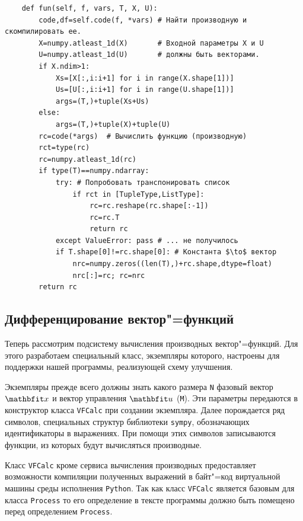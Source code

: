 \documentclass[a4paper,14pt, openany, twoside, draft]{extbook} %
\begin{document}
\begin{verbatim}
    def fun(self, f, vars, T, X, U):
        code,df=self.code(f, *vars) # Найти производную и скомпилировать ее.
        X=numpy.atleast_1d(X)       # Входной параметры X и U
        U=numpy.atleast_1d(U)       # должны быть векторами.
        if X.ndim>1:
            Xs=[X[:,i:i+1] for i in range(X.shape[1])]
            Us=[U[:,i:i+1] for i in range(U.shape[1])]
            args=(T,)+tuple(Xs+Us)
        else:
            args=(T,)+tuple(X)+tuple(U)
        rc=code(*args)  # Вычислить функцию (производную)
        rct=type(rc)
        rc=numpy.atleast_1d(rc)
        if type(T)==numpy.ndarray:
            try: # Попробовать транспонировать список
                if rct in [TupleType,ListType]:
                    rc=rc.reshape(rc.shape[:-1])
                    rc=rc.T
                    return rc
            except ValueError: pass # ... не получилось
            if T.shape[0]!=rc.shape[0]: # Константа $\to$ вектор
                nrc=numpy.zeros((len(T),)+rc.shape,dtype=float)
                nrc[:]=rc; rc=nrc
        return rc
\end{verbatim}

\subsection{Дифференцирование вектор"=функций}
\label{sec:VFdiff}

Теперь рассмотрим подсистему вычисления производных вектор"=функций.  Для этого разработаем специальный класс, экземпляры которого, настроены для поддержки нашей программы, реализующей схему улучшения.

Экземпляры прежде всего должны знать какого размера \texttt{N} фазовый вектор $\vecx$ и вектор управления $\vecu$ (\texttt{M}).  Эти параметры передаются в конструктор класса \texttt{VFCalc} при создании экземпляра.  Далее порождается ряд символов, специальных структур библиотеки \texttt{sympy}, обозначающих идентификаторы в выражениях.  При помощи этих символов записываются функции, из которых будут вычисляться производные.

Класс \texttt{VFCalc} кроме сервиса вычисления производных предоставляет возможности компиляции полученных выражений в байт"=код виртуальной машины среды исполнения \texttt{Python}.  Так как класс \texttt{VFCalc} является базовым для класса \texttt{Process} то его определение в тексте программы должно быть помещено перед определением \texttt{Process}.
\end{document}
